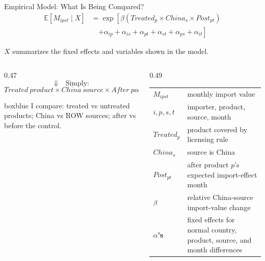 \documentclass[aspectratio=169,11pt]{beamer}
\begin{document}
\begin{frame}{Empirical Model: What Is Being Compared?}
  \vspace{-0.25cm}
  \scriptsize
  \[
  \begin{aligned}
  \mathbb{E}[M_{ipst}\mid X]
  &=
  \exp\left[
  \beta\left(Treated_p \times China_s \times Post_{pt}\right) \right.\\
  &\quad \left.
  +\alpha_{ip}+\alpha_{is}+\alpha_{pt}
  +\alpha_{st}+\alpha_{ps}+\alpha_{it}
  \right]
  \end{aligned}
  \]

  \vspace{-0.35cm}
  {\tiny \(X\) summarizes the fixed effects and variables shown in the model.}

  \vspace{-0.25cm}
  \begin{columns}[T,totalwidth=\textwidth]
    \begin{column}{0.47\textwidth}
      \centering
      \[
      \Downarrow \quad \text{Simply:}
      \]
      \vspace{-0.25cm}
      \[
      Treated\ product \times China\ source \times After\ policy
      \]

      \begin{beamercolorbox}[rounded=true,sep=0.50em,wd=\textwidth]{boxblue}
        \footnotesize I compare: treated vs untreated products; China vs ROW sources; after vs before the control.
      \end{beamercolorbox}
    \end{column}
    \begin{column}{0.49\textwidth}
      \scriptsize
      \begin{tabularx}{\textwidth}{>{\bfseries}p{}X}
        \(M_{ipst}\) & monthly import value \\
        \(i,p,s,t\) & importer, product, source, month \\
        \(Treated_p\) & product covered by licensing rule \\
        \(China_s\) & source is China \\
        \(Post_{pt}\) & after product \(p\)'s expected import-effect month \\
        \(\beta\) & relative China-source import-value change \\
        \(\alpha\)'s & fixed effects for normal country, product, source, and month differences \\
      \end{tabularx}
    \end{column}
  \end{columns}
\end{frame}
\end{document}
